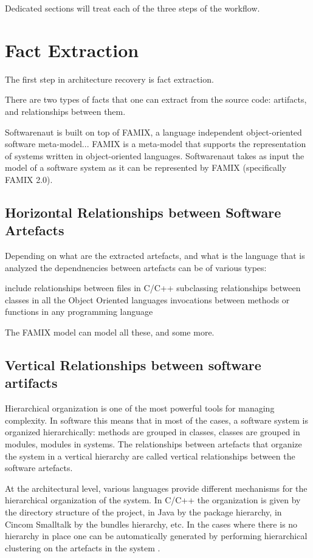 \documentclass[preprint,12pt]{elsarticle}
\begin{document}
Dedicated sections will treat each of the three steps of the workflow.




\newpage
\section {Fact Extraction}
\label{sec:facts}

The first step in architecture recovery is fact extraction. 

There are two types of facts that one can extract from the source code: artifacts, and relationships between them. 

Softwarenaut is built on top of FAMIX, a language independent object-oriented software meta-model...
FAMIX is a meta-model that supports the representation of systems written in object-oriented languages. Softwarenaut takes as input the model of a software system as it can be represented by FAMIX (specifically FAMIX 2.0). 


\subsection {Horizontal Relationships between Software Artefacts}

Depending on what are the extracted artefacts, and what is the language that is analyzed the dependnencies between artefacts can be of various types:

include relationships between files in C/C++
subclassing relationships between classes in all the Object Oriented languages
invocations between methods or functions in any programming language

The FAMIX model can model all these, and some more.


\subsection {Vertical Relationships between software artifacts}

Hierarchical organization is one of the most powerful tools for managing complexity. In software this means that in most of the cases, a software system is organized hierarchically: methods are grouped in classes, classes are grouped in modules, modules in systems. The relationships between artefacts that organize the system in a vertical hierarchy are called vertical relationships between the software artefacts. 

At the architectural level, various languages provide different mechanisms for the hierarchical organization of the system. In C/C++ the organization is given by the directory structure of the project, in Java by the package hierarchy, in Cincom Smalltalk by the bundles hierarchy, etc. In the cases where there is no hierarchy in place one can be automatically generated by performing hierarchical clustering on the artefacts in the system \cite{lungu-clust}. 
\end{document}
